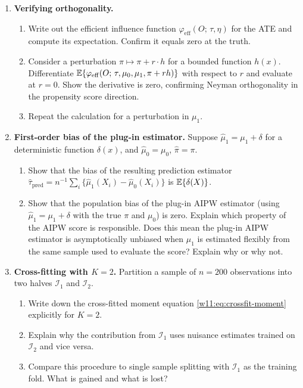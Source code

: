 \documentclass[master.tex]{subfiles}
\begin{document}
\begin{enumerate}

\item \textbf{Verifying orthogonality.}
  \begin{enumerate}
    \item Write out the efficient influence function
      $\varphi_{\mathrm{eff}}(O;\,\tau,\eta)$ for the ATE and
      compute its expectation.  Confirm it equals zero at the truth.
    \item Consider a perturbation $\pi \mapsto \pi + r\cdot h$ for a
      bounded function $h(x)$.  Differentiate
      $\mathbb{E}\{\varphi_{\mathrm{eff}}(O;\,\tau, \mu_0, \mu_1, \pi+rh)\}$
      with respect to $r$ and evaluate at $r=0$.  Show the
      derivative is zero, confirming Neyman orthogonality in the
      propensity score direction.
    \item Repeat the calculation for a perturbation in $\mu_1$.
  \end{enumerate}

\item \textbf{First-order bias of the plug-in estimator.}
  Suppose $\hat\mu_1 = \mu_1 + \delta$ for a deterministic function
  $\delta(x)$, and $\hat\mu_0 = \mu_0$, $\hat\pi = \pi$.
  \begin{enumerate}
    \item Show that the bias of the resulting prediction estimator
      $\hat\tau_{\mathrm{pred}} = n^{-1}\sum_i
      \{\hat\mu_1(X_i) - \hat\mu_0(X_i)\}$ is
      $\mathbb{E}\{\delta(X)\}$.
    \item Show that the population bias of the plug-in AIPW
      estimator (using $\hat\mu_1 = \mu_1 + \delta$ with the
      true $\pi$ and $\mu_0$) is zero.  Explain which property
      of the AIPW score is responsible.  Does this mean the
      plug-in AIPW estimator is asymptotically unbiased when
      $\hat\mu_1$ is estimated flexibly from the same sample
      used to evaluate the score?  Explain why or why not.
  \end{enumerate}

\item \textbf{Cross-fitting with $K=2$.}
  Partition a sample of $n=200$ observations into two halves
  $\mathcal{I}_1$ and $\mathcal{I}_2$.
  \begin{enumerate}
    \item Write down the cross-fitted moment equation
      \eqref{w11:eq:crossfit-moment} explicitly for $K=2$.
    \item Explain why the contribution from $\mathcal{I}_1$
      uses nuisance estimates trained on $\mathcal{I}_2$ and
      vice versa.
    \item Compare this procedure to single sample splitting
      with $\mathcal{I}_1$ as the training fold.  What is
      gained and what is lost?
  \end{enumerate}


\end{enumerate}
\end{document}
